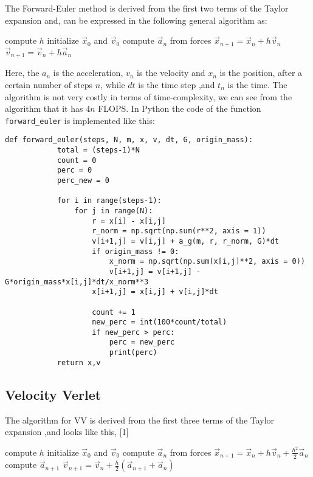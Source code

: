 \documentclass{article}
\begin{document}
The Forward-Euler method is derived from the first two terms of the Taylor expansion and,  can be expressed in the following general algorithm as:

\begin{algorithmic}[H]
\State compute $h$
\State initialize $\vec{x}_0$ and $\vec{v}_0$
	\State compute $\vec{a}_n$ from forces
	\State $\vec{x}_{n+1} = \vec{x}_n+ h \vec{v}_n$
	\State $\vec{v}_{n+1} = \vec{v}_n + h \vec{a}_n$
\EndFor
\State
\end{algorithmic}

Here, the  $a_n$ is the acceleration, $v_n$ is the velocity and $x_n$ is the position, after a certain number of steps $n$, while $dt$ is the time step ,and $t_n $ is the time. The algorithm is not very costly in terms of  time-complexity, we can see from the algorithm that it has  $4n$ FLOPS. In Python the code of the function  \lstinline{forward_euler} is implemented like this: 

\begin{lstlisting}
def forward_euler(steps, N, m, x, v, dt, G, origin_mass):
            total = (steps-1)*N
            count = 0
            perc = 0
            perc_new = 0

            for i in range(steps-1):
                for j in range(N):
                    r = x[i] - x[i,j]
                    r_norm = np.sqrt(np.sum(r**2, axis = 1))
                    v[i+1,j] = v[i,j] + a_g(m, r, r_norm, G)*dt
                    if origin_mass != 0:
                        x_norm = np.sqrt(np.sum(x[i,j]**2, axis = 0))
                        v[i+1,j] = v[i+1,j] - G*origin_mass*x[i,j]*dt/x_norm**3
                    x[i+1,j] = x[i,j] + v[i,j]*dt

                    count += 1
                    new_perc = int(100*count/total)
                    if new_perc > perc:
                        perc = new_perc
                        print(perc)
            return x,v
\end{lstlisting}
\subsection{Velocity Verlet}\label{const_mot}

The algorithm for VV is derived from the first three terms of the Taylor expansion ,and looks like this, [1]%

\begin{algorithmic}[H]
\State compute $h$
\State initialize $\vec{x}_0$ and $\vec{v}_0$
	\State compute $\vec{a}_n$ from forces
	\State $\vec{x}_{n+1} = \vec{x}_n + h\vec{v}_n + \frac{h^2}{2}\vec{a}_n$
	\State compute $\vec{a}_{n+1}$
	\State $\vec{v}_{n+1} = \vec{v}_n+ \frac{h}{2}\left( \vec{a}_{n+1} + \vec{a}_n \right)$
\EndFor
\State
\end{algorithmic}
\end{document}
